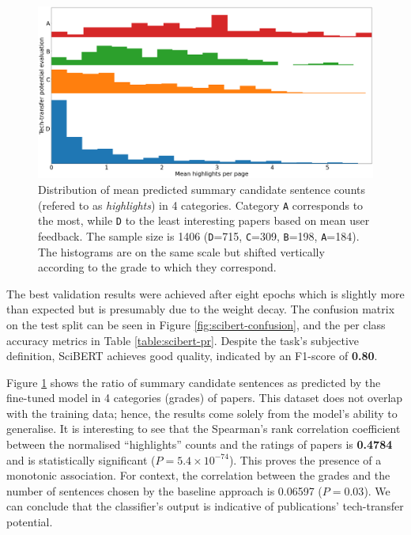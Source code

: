 \begin{figure}[h]
    \centering
    \includegraphics[width=0.9\linewidth]{figures/highlights-histograms.png}
    \captionsetup{width=.9\linewidth}
    \caption{Distribution of mean predicted summary candidate sentence counts (refered to as \textit{highlights}) in 4 categories. Category \texttt{A} corresponds to the most, while \texttt{D} to the least interesting papers based on mean user feedback. The sample size is 1406 (\texttt{D}=715, \texttt{C}=309, \texttt{B}=198, \texttt{A}=184). The histograms are on the same scale but shifted vertically according to the grade to which they correspond.}
    \label{fig:histograms}
\end{figure}

The best validation results were achieved after eight epochs which is slightly more than expected but is presumably due to the weight decay. The confusion matrix on the test split can be seen in Figure \ref{fig:scibert-confusion}, and the per class accuracy metrics in Table \ref{table:scibert-pr}. Despite the task's subjective definition, SciBERT achieves good quality, indicated by an F1-score of \textbf{0.80}.

Figure \ref{fig:histograms} shows the ratio of summary candidate sentences as predicted by the fine-tuned model in 4 categories (grades) of papers. This dataset does not overlap with the training data; hence, the results come solely from the model's ability to generalise. It is interesting to see that the Spearman's rank correlation coefficient \cite{spearman1961proof} between the normalised ``highlights'' counts and the ratings of papers is \textbf{0.4784} and is statistically significant ($P = 5.4 \times 10^{-74}$). This proves the presence of a monotonic association. For context, the correlation between the grades and the number of sentences chosen by the baseline approach is 0.06597 ($P = 0.03$). We can conclude that the classifier's output is indicative of publications' tech-transfer potential. 

